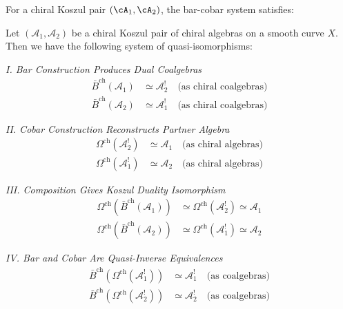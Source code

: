 \begin{theorem}
\label{thm:bar-cobar-isomorphism-main-equations}
\textup{For a chiral Koszul pair $(\cA_1, \cA_2)$, the bar-cobar
system satisfies:}

Let $(\mathcal{A}_1, \mathcal{A}_2)$ be a chiral Koszul pair of chiral algebras on a
smooth curve $X$. Then we have the following system of quasi-isomorphisms:

\medskip
\noindent\emph{I. Bar Construction Produces Dual Coalgebras}
\begin{align}
\bar{B}^{\text{ch}}(\mathcal{A}_1) &\simeq \mathcal{A}_2^! \quad
   \text{(as chiral coalgebras)} \label{eq:bar-A1-is-A2-dual} \\
\bar{B}^{\text{ch}}(\mathcal{A}_2) &\simeq \mathcal{A}_1^! \quad
   \text{(as chiral coalgebras)} \label{eq:bar-A2-is-A1-dual}
\end{align}

\medskip
\noindent\emph{II. Cobar Construction Reconstructs Partner Algebra}
\begin{align}
\Omega^{\text{ch}}(\mathcal{A}_2^!) &\simeq \mathcal{A}_1 \quad
   \text{(as chiral algebras)} \label{eq:cobar-A2-dual-is-A1} \\
\Omega^{\text{ch}}(\mathcal{A}_1^!) &\simeq \mathcal{A}_2 \quad
   \text{(as chiral algebras)} \label{eq:cobar-A1-dual-is-A2}
\end{align}

\medskip
\noindent\emph{III. Composition Gives Koszul Duality Isomorphism}
\begin{align}
\Omega^{\text{ch}}(\bar{B}^{\text{ch}}(\mathcal{A}_1)) &\simeq
   \Omega^{\text{ch}}(\mathcal{A}_2^!) \simeq \mathcal{A}_1
   \label{eq:bar-cobar-resolution-A1} \\
\Omega^{\text{ch}}(\bar{B}^{\text{ch}}(\mathcal{A}_2)) &\simeq
   \Omega^{\text{ch}}(\mathcal{A}_1^!) \simeq \mathcal{A}_2
   \label{eq:bar-cobar-resolution-A2}
\end{align}

\medskip
\noindent\emph{IV. Bar and Cobar Are Quasi-Inverse Equivalences}
\begin{align}
\bar{B}^{\text{ch}}(\Omega^{\text{ch}}(\mathcal{A}_1^!)) &\simeq \mathcal{A}_1^!
   \quad \text{(as coalgebras)} \\
\bar{B}^{\text{ch}}(\Omega^{\text{ch}}(\mathcal{A}_2^!)) &\simeq \mathcal{A}_2^!
   \quad \text{(as coalgebras)}
\end{align}


\end{theorem}
